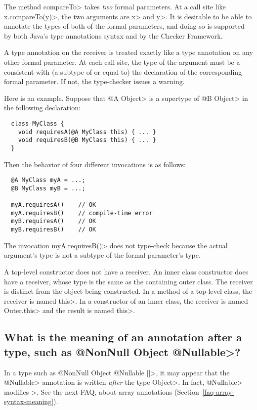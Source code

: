 The method \<compareTo> takes \emph{two} formal parameters.  At a call site
like \<x.compareTo(y)>, the two arguments are \<x> and \<y>.  It is
desirable to be able to annotate the types of both of the formal
parameters, and doing so is supported by both Java's type annotations
syntax and by the Checker Framework.

A type annotation on the receiver is treated exactly like a type annotation
on any other formal parameter.  At each call site, the type of the argument
must be a consistent with (a subtype of or equal to) the declaration of the
corresponding formal parameter.  If not, the type-checker issues a warning.

Here is an example.  Suppose that \<@A Object> is a supertype of \<@B
Object> in the following declaration:

\begin{Verbatim}
  class MyClass {
    void requiresA(@A MyClass this) { ... }
    void requiresB(@B MyClass this) { ... }
  }
\end{Verbatim}

\noindent
Then the behavior of four different invocations is as follows:

\begin{Verbatim}
  @A MyClass myA = ...;
  @B MyClass myB = ...;

  myA.requiresA()    // OK
  myA.requiresB()    // compile-time error
  myB.requiresA()    // OK
  myB.requiresB()    // OK
\end{Verbatim}

The invocation \<myA.requiresB()> does not type-check because the actual
argument's type is not a subtype of the formal parameter's type.

A top-level constructor does not have a receiver.  An inner class
constructor does have a receiver, whose type is the same as the containing
outer class.  The receiver is distinct from the object being constructed.
In a method of a top-level class, the receiver is named \<this>.  In a
constructor of an inner class, the receiver is named \<Outer.this> and the
result is named \<this>.


\subsection{What is the meaning of an annotation after a type, such as \<@NonNull Object @Nullable>?\label{faq-annotation-after-type}}

In a type such as \<@NonNull Object @Nullable []>, it may appear that the
\<@Nullable> annotation is written \emph{after} the type \<Object>.  In
fact, \<@Nullable> modifies \<[]>.  See the next FAQ, about array
annotations (Section~\ref{faq-array-syntax-meaning}).


